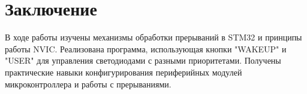 \section*{Заключение}

В ходе работы изучены механизмы обработки прерываний в STM32 и принципы работы NVIC. Реализована программа, использующая кнопки "WAKEUP" и "USER" для управления светодиодами с разными приоритетами. Получены практические навыки конфигурирования периферийных модулей микроконтроллера и работы с прерываниями.


\newpage